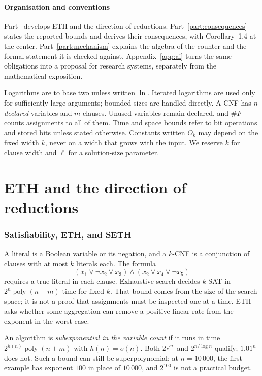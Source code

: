 \documentclass[11pt,reqno]{amsart}
\numberwithin{equation}{section}
\theoremstyle{plain}
\theoremstyle{definition}
\theoremstyle{remark}
\newcommand{\poly}{\operatorname{poly}}
\begin{document}
\subsection{Organisation and conventions}
Part~\ref{part:eth} develops ETH and the direction of reductions.
Part~\ref{part:consequences} states the reported bounds and derives their
consequences, with Corollary~1.4 at the center. Part~\ref{part:mechanism}
explains the algebra of the counter and the formal statement it is checked
against. Appendix~\ref{app:ai} turns the same obligations into a proposal for
research systems, separately from the mathematical exposition.

Logarithms are to base two unless written $\ln$. Iterated logarithms are used
only for sufficiently large arguments; bounded sizes are handled directly. A
CNF has $n$ \emph{declared} variables and $m$ clauses. Unused variables
remain declared, and $\#F$ counts assignments to all of them. Time and space
bounds refer to bit operations and stored bits unless stated otherwise.
Constants written $O_k$ may depend on the fixed width $k$, never on a width
that grows with the input. We reserve $k$ for clause width and $\ell$ for a
solution-size parameter.


\part{ETH and the direction of reductions}\label{part:eth}

\section{Satisfiability, ETH, and SETH}\label{sec:eth}

A literal is a Boolean variable or its negation, and a $k$-CNF is a
conjunction of clauses with at most $k$ literals each. The formula
\[
 (x_1\lor\neg x_2\lor x_3)\land(x_2\lor x_4\lor\neg x_5)
\]
requires a true literal in each clause. Exhaustive search decides $k$-SAT in
$2^n\poly(n+m)$ time for fixed $k$. That bound comes from the size of the
search space; it is not a proof that assignments must be inspected one at a
time. ETH asks whether some aggregation can remove a positive linear rate
from the exponent in the worst case.

An algorithm is \emph{subexponential in the variable count} if it runs in
time $2^{h(n)}\poly(n+m)$ with $h(n)=o(n)$. Both $2^{\sqrt n}$ and
$2^{n/\log n}$ qualify; $1.01^n$ does not. Such a bound can still be
superpolynomial: at $n=10\,000$, the first example has exponent $100$ in
place of $10\,000$, and $2^{100}$ is not a practical budget.
\end{document}
